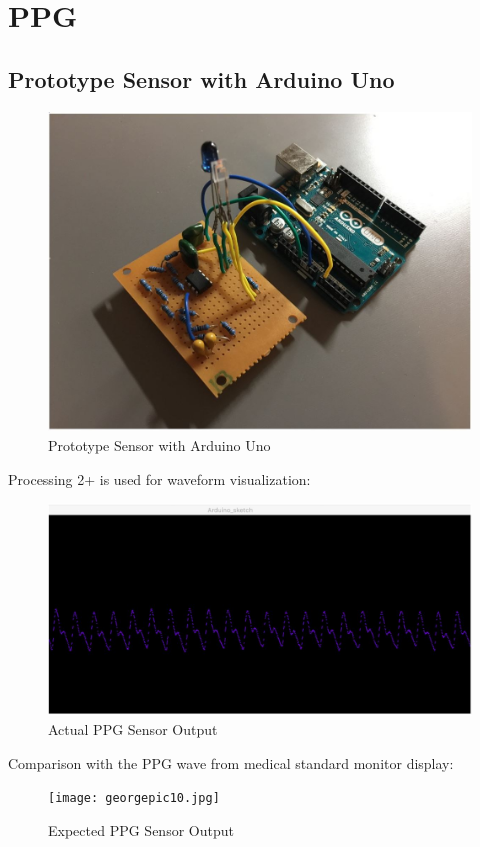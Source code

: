 \section{PPG}


\subsection{Prototype Sensor with Arduino Uno}

\begin{figure}[H]
	\centering
	\includegraphics[width=0.7\linewidth]{georgepic8.jpg}
	\caption{Prototype Sensor with Arduino Uno}
\end{figure}

Processing 2+ is used for waveform visualization:

\begin{figure}[H]
	\centering
	\includegraphics[width=0.8\linewidth]{georgepic9.jpg}
	\caption{Actual PPG Sensor Output}
\end{figure}

Comparison with the PPG wave from medical standard monitor display:

\begin{figure}[H]
	\centering
	\texttt{[image: georgepic10.jpg]}
	\caption{Expected PPG Sensor Output}
\end{figure}

